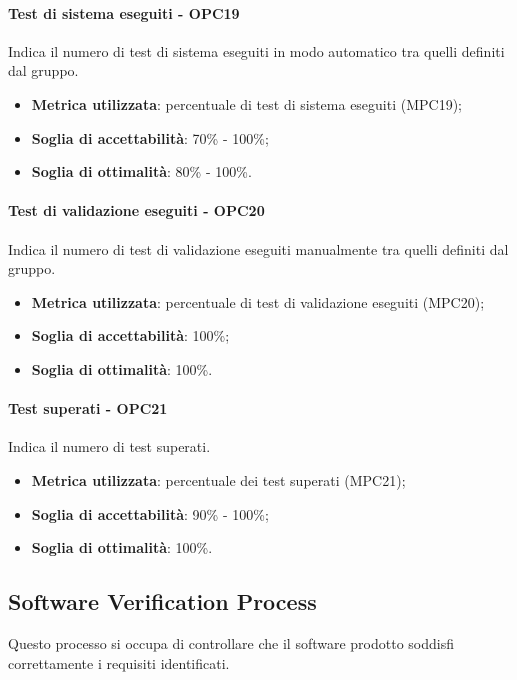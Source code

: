 \documentclass[PdQ.tex]{subfiles}
\begin{document}
			\paragraph{Test di sistema eseguiti - OPC19}
				Indica il numero di test di sistema eseguiti in modo automatico tra quelli definiti dal gruppo.
				\begin{itemize}
					\item \textbf{Metrica utilizzata}: percentuale di test di sistema eseguiti (MPC19);
					\item \textbf{Soglia di accettabilità}: 70\% - 100\%;
					\item \textbf{Soglia di ottimalità}: 80\% - 100\%.
				\end{itemize}
				
			\paragraph{Test di validazione eseguiti - OPC20}
				Indica il numero di test di validazione eseguiti manualmente tra quelli definiti dal gruppo.
				\begin{itemize}
					\item \textbf{Metrica utilizzata}: percentuale di test di validazione eseguiti (MPC20);
					\item \textbf{Soglia di accettabilità}: 100\%;
					\item \textbf{Soglia di ottimalità}: 100\%.
				\end{itemize}
				
			\paragraph{Test superati - OPC21}
				Indica il numero di test superati.
				\begin{itemize}
					\item \textbf{Metrica utilizzata}: percentuale dei test superati (MPC21);
					\item \textbf{Soglia di accettabilità}: 90\% - 100\%;
					\item \textbf{Soglia di ottimalità}: 100\%.
				\end{itemize}
					
	\subsection{Software Verification Process}
		Questo processo si occupa di controllare che il software prodotto soddisfi correttamente i requisiti identificati.
		
\end{document}
